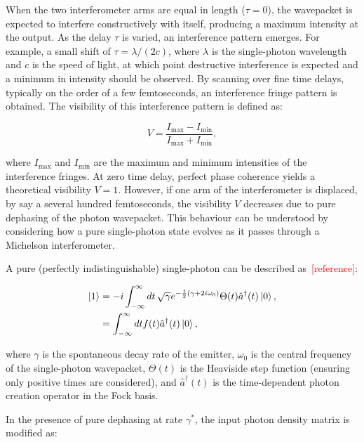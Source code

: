 When the two interferometer arms are equal in length ($\tau = 0$), the wavepacket is expected to interfere constructively with itself, producing a maximum intensity at the output. As the delay $\tau$ is varied, an interference pattern emerges. For example, a small shift of $\tau = \lambda / (2c)$, where $\lambda$ is the single-photon wavelength and $c$ is the speed of light, at which point destructive interference is expected and a minimum in intensity should be observed. By scanning over fine time delays, typically on the order of a few femtoseconds, an interference fringe pattern is obtained. The visibility of this interference pattern is defined as:

\begin{equation}
    V = \frac{I_\text{max} - I_\text{min}}{I_\text{max} + I_\text{min}},
\end{equation}

where $I_\text{max}$ and $I_\text{min}$ are the maximum and minimum intensities of the interference fringes. At zero time delay, perfect phase coherence yields a theoretical visibility $V = 1$. However, if one arm of the interferometer is displaced, by say a several hundred femtoseconds, the visibility $V$ decreases due to pure dephasing of the photon wavepacket. This behaviour can be understood by considering how a pure single-photon state evolves as it passes through a Michelson interferometer.

A pure (perfectly indistinguishable) single-photon can be described as~\textcolor{red}{[reference]}:

\begin{equation}
\begin{aligned}
    \ket{1} & = -i\int_{-\infty}^{\infty} dt\, \sqrt{\gamma} e^{-\frac{t}{2}(\gamma+2i\omega_0)} \Theta(t) \hat{a}^{\dagger}(t) \ket{0}, \\
    & = \int_{-\infty}^{\infty} dt f(t) \hat{a}^{\dagger}(t) \ket{0},
    \label{eqn:wavepacket}
\end{aligned}
\end{equation}

where $\gamma$ is the spontaneous decay rate of the emitter, $\omega_0$ is the central frequency of the single-photon wavepacket, $\Theta(t)$ is the Heaviside step function (ensuring only positive times are considered), and $\hat{a}^{\dagger}(t)$ is the time-dependent photon creation operator in the Fock basis. 

In the presence of pure dephasing at rate $\gamma^*$, the input photon density matrix is modified as:


